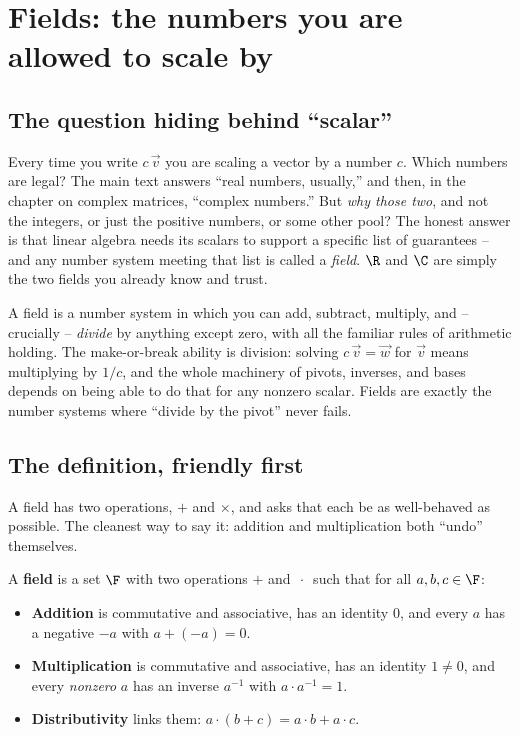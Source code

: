 \section{Fields: the numbers you are allowed to scale by}
\label{ch38:fields}

\subsection{The question hiding behind ``scalar''}

Every time you write $c\,\vec{v}$ you are scaling a vector by a number $c$. Which numbers
are legal? The main text answers ``real numbers, usually,'' and then, in the chapter on
complex matrices, ``complex numbers.'' But \emph{why those two}, and not the integers, or
just the positive numbers, or some other pool? The honest answer is that linear algebra
needs its scalars to support a specific list of guarantees -- and any number system
meeting that list is called a \emph{field}. $\R$ and $\C$ are simply the two fields you
already know and trust.

\begin{intuitionbox}
A field is a number system in which you can add, subtract, multiply, and -- crucially --
\emph{divide} by anything except zero, with all the familiar rules of arithmetic holding.
The make-or-break ability is division: solving $c\,\vec{v} = \vec{w}$ for $\vec{v}$ means
multiplying by $1/c$, and the whole machinery of pivots, inverses, and bases depends on
being able to do that for any nonzero scalar. Fields are exactly the number systems where
``divide by the pivot'' never fails.
\end{intuitionbox}

\subsection{The definition, friendly first}

A field has two operations, $+$ and $\times$, and asks that each be as well-behaved as
possible. The cleanest way to say it: addition and multiplication both ``undo''
themselves.

\begin{formalbox}
A \textbf{field} is a set $\F$ with two operations $+$ and $\,\cdot\,$ such that for all
$a,b,c \in \F$:
\begin{itemize}
  \item \textbf{Addition} is commutative and associative, has an identity $0$, and every
        $a$ has a negative $-a$ with $a + (-a) = 0$.
  \item \textbf{Multiplication} is commutative and associative, has an identity $1 \ne 0$,
        and every \emph{nonzero} $a$ has an inverse $a^{-1}$ with $a \cdot a^{-1} = 1$.
  \item \textbf{Distributivity} links them: $a\cdot(b+c) = a\cdot b + a\cdot c$.
\end{itemize}
\end{formalbox}

